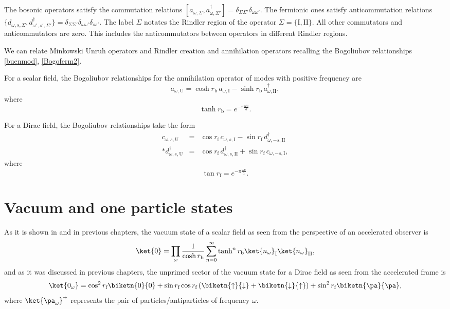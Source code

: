 The bosonic operators satisfy the commutation relations $[a^{\phantom{\dagger}}_{\omega,\Sigma},a^\dagger_{\omega,\Sigma'}]=\delta_{\Sigma\Sigma'}\delta_{\omega\omega'}$. The fermionic ones satisfy  anticommutation relations $\{d^{\phantom{\dagger}}_{\omega,s,\Sigma},d^\dagger_{\omega',s',\Sigma'}\}=\delta_{\Sigma\Sigma'}\delta_{\omega\omega'}\delta_{ss'}$. The label $\Sigma$ notates the Rindler region of the operator  $\Sigma=\{\text{I},\text{II}\}$.  All other commutators and anticommutators are zero. This includes the anticommutators between operators in different Rindler regions.

We can relate Minkowski Unruh operators and Rindler creation and annihilation operators recalling the Bogoliubov relationships \eqref{buenmod}, \eqref{Bogoferm2}.

For a scalar field, the Bogoliubov relationships for the annihilation operator of modes with positive frequency are
\begin{equation}\label{bogoboson}
 a_{\omega,\text{U}}=\cosh r_\text{b}\, a_{\omega,\text{I}} - \sinh r_\text{b}\, a^\dagger_{\omega,\text{II}},
\end{equation}
where
\begin{equation}\label{defr1}
\tanh r_\text{b}=e^{-\pi \frac{\omega c}{a}}.
\end{equation}

For a Dirac field, the Bogoliubov relationships take the form
\begin{eqnarray}\label{bogodirac}
\nonumber c_{\omega,s,\text{U}}&=&\cos{r_\text{f}}\,c_{\omega,s,\text{I}}-\sin r_\text{f}\,d^\dagger_{\omega,-s,\text{II}}\\*
d^\dagger_{\omega,s,\text{U}}&=&\cos{r_\text{f}}\,d^\dagger_{\omega,s,\text{II}}+\sin r_\text{f}\,c_{\omega,-s,\text{I}},
\end{eqnarray}
where
\begin{equation}\label{defr2}
\tan r_\text{f}=e^{-\pi \frac{\omega c}{a}}.
\end{equation}

\section{Vacuum and one particle states}\label{sec3}

As it is shown in \cite{Alicefalls} and in previous chapters, the vacuum state of a scalar field as seen from the perspective of an accelerated observer is
\begin{equation}\label{scavac}
\ket{0}=\prod_{\omega}\frac{1}{\cosh r_\text{b}}\sum_{n=0}^\infty \tanh^n r_\text{b} \ket{n_\omega}_\text{I}\ket{n_{\omega}}_{\text{II}},
\end{equation}
and as it was discussed in previous chapters, the unprimed sector of the vacuum state for a Dirac field as seen from the accelerated frame is
\begin{equation}\label{diravac}
 \ket{0_\omega}=\cos^2 r_\text{f}\biketn{0}{0}+\sin r_\text{f}\cos r_\text{f}\left(\biketn{\uparrow}{\downarrow}+\biketn{\downarrow}{\uparrow}\right)+\sin^2 r_\text{f}\biketn{\pa}{\pa},
\end{equation}
where $\ket{\pa_\omega}^\pm$ represents the pair of particles/antiparticles of frequency $\omega$.

